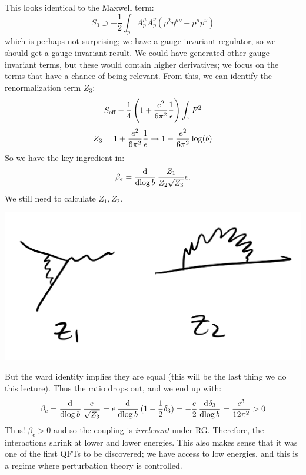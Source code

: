 This looks identical to the Maxwell term:
\begin{equation}
    S_0 \supset -\frac{1}{2}\int_p A^\mu_p A^\nu_p(p^2 \eta^{\mu\nu} - p^\mu p^\nu)
\end{equation}
which is perhaps not surprising; we have a gauge invariant regulator, so we should get a gauge invariant result. We could have generated other gauge invariant terms, but these would contain higher derivatives; we focus on the terms that have a chance of being relevant. From this, we can identify the renormalization term $Z_3$:
\begin{equation}
    S_{\text{eff}} -\frac{1}{4}\left(1 + \frac{e^2}{6\pi^2}\frac{1}{\epsilon}\right)\int_x F^2
\end{equation}
\begin{equation}
    Z_3 = 1 + \frac{e^2}{6\pi^2}\frac{1}{\epsilon} \to 1 - \frac{e^2}{6\pi^2}\log(b)
\end{equation}
So we have the key ingredient in:
\begin{equation}
    \beta_e = \dod{}{\log b}\frac{Z_1}{Z_2\sqrt{Z_3}}e.
\end{equation}
We still need to calculate $Z_1, Z_2$. 

\begin{center}
    \includegraphics[scale=0.35]{Lectures/Images/lec11-Z1Z2.png}
\end{center}

But the ward identity implies they are equal (this will be the last thing we do this lecture). Thus the ratio drops out, and we end up with:
\begin{equation}
    \beta_e = \dod{}{\log b}\frac{e}{\sqrt{Z_3}} = e\dod{}{\log b}(1 - \frac{1}{2}\delta_3) = -\frac{e}{2}\dod{\delta_3}{\log b} = \frac{e^3}{12\pi^2} > 0
\end{equation}
Thus! $\beta_e > 0$ and so the coupling is \emph{irrelevant} under RG. Therefore, the interactions shrink at lower and lower energies. This also makes sense that it was one of the first QFTs to be discovered; we have access to low energies, and this is a regime where perturbation theory is controlled.

